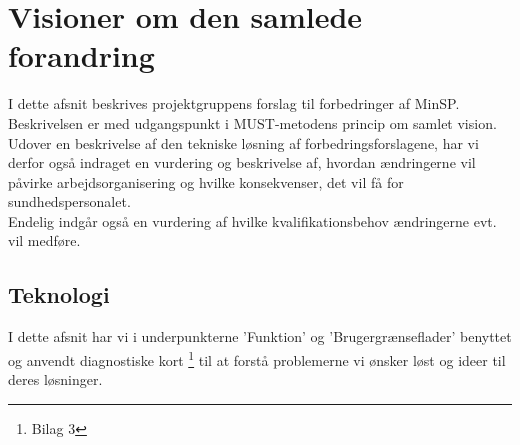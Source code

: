 %
%
%
%
%
%
%
%
%
%
%
%
%
%
%
%
%
%
%
%
%
%
%
%
%
%
%
\section{Visioner om den samlede forandring}
I dette afsnit beskrives projektgruppens forslag til forbedringer af MinSP. Beskrivelsen er med udgangspunkt i MUST-metodens princip om samlet vision.
Udover en beskrivelse af den tekniske løsning af forbedringsforslagene, har vi derfor også indraget en vurdering og beskrivelse af, hvordan ændringerne vil påvirke arbejdsorganisering og hvilke konsekvenser, det vil få for sundhedspersonalet. \\
Endelig indgår også en vurdering af hvilke kvalifikationsbehov ændringerne evt. vil medføre.
\subsection{Teknologi}
I dette afsnit har vi i underpunkterne 'Funktion' og 'Brugergrænseflader' benyttet og anvendt diagnostiske kort \footnote{Bilag 3} til at forstå problemerne vi ønsker løst og ideer til deres løsninger.
%
%
